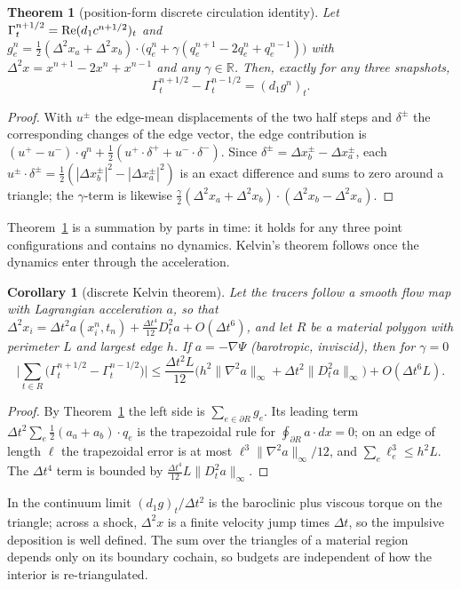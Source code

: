 \documentclass[11pt]{article}
\newtheorem{theorem}{Theorem}\newtheorem{proposition}{Proposition}\newtheorem{corollary}{Corollary}
\theoremstyle{definition}\newtheorem{definition}{Definition}\theoremstyle{remark}\newtheorem{remark}{Remark}
\begin{document}
\begin{theorem}[position-form discrete circulation identity]\label{thm:kelvin}
Let $\Gamma_t^{n+1/2}=\operatorname{Re}(d_1c^{n+1/2})_t$ and $g^n_e=\frac12(\Delta^2x_a+\Delta^2x_b)\cdot\big(q_e^n+\gamma(q_e^{n+1}-2q_e^n+q_e^{n-1})\big)$ with $\Delta^2x=x^{n+1}-2x^n+x^{n-1}$ and any $\gamma\in\mathbb R$. Then, exactly for any three snapshots,
\begin{equation}
\Gamma_t^{n+1/2}-\Gamma_t^{n-1/2}=(d_1g^n)_t.
\end{equation}
\end{theorem}
\begin{proof}
With $u^\pm$ the edge-mean displacements of the two half steps and $\delta^\pm$ the corresponding changes of the edge vector, the edge contribution is $(u^+-u^-)\cdot q^n+\frac12(u^+\cdot\delta^++u^-\cdot\delta^-)$. Since $\delta^\pm=\Delta x_b^\pm-\Delta x_a^\pm$, each $u^\pm\cdot\delta^\pm=\frac12(|\Delta x_b^\pm|^2-|\Delta x_a^\pm|^2)$ is an exact difference and sums to zero around a triangle; the $\gamma$-term is likewise $\frac\gamma2(\Delta^2x_a+\Delta^2x_b)\cdot(\Delta^2x_b-\Delta^2x_a)$.
\end{proof}
Theorem~\ref{thm:kelvin} is a summation by parts in time: it holds for any three point configurations and contains no dynamics. Kelvin's theorem follows once the dynamics enter through the acceleration.
\begin{corollary}[discrete Kelvin theorem]\label{cor:kelvin}
Let the tracers follow a smooth flow map with Lagrangian acceleration $a$, so that $\Delta^2x_i=\Delta t^2a(x_i^n,t_n)+\frac{\Delta t^4}{12}D_t^2a+O(\Delta t^6)$, and let $R$ be a material polygon with perimeter $L$ and largest edge $h$. If $a=-\nabla\Psi$ (barotropic, inviscid), then for $\gamma=0$
\begin{equation}
\Big|\sum_{t\in R}\big(\Gamma_t^{n+1/2}-\Gamma_t^{n-1/2}\big)\Big|\le\frac{\Delta t^2L}{12}\Big(h^2\|\nabla^2a\|_\infty+\Delta t^2\|D_t^2a\|_\infty\Big)+O(\Delta t^6L).
\end{equation}
\end{corollary}
\begin{proof}
By Theorem~\ref{thm:kelvin} the left side is $\sum_{e\in\partial R}g_e$. Its leading term $\Delta t^2\sum_e\frac12(a_a+a_b)\cdot q_e$ is the trapezoidal rule for $\oint_{\partial R}a\cdot dx=0$; on an edge of length $\ell$ the trapezoidal error is at most $\ell^3\|\nabla^2a\|_\infty/12$, and $\sum_e\ell_e^3\le h^2L$. The $\Delta t^4$ term is bounded by $\frac{\Delta t^4}{12}L\|D_t^2a\|_\infty$.
\end{proof}
In the continuum limit $(d_1g)_t/\Delta t^2$ is the baroclinic plus viscous torque on the triangle; across a shock, $\Delta^2x$ is a finite velocity jump times $\Delta t$, so the impulsive deposition is well defined. The sum over the triangles of a material region depends only on its boundary cochain, so budgets are independent of how the interior is re-triangulated.
\end{document}
